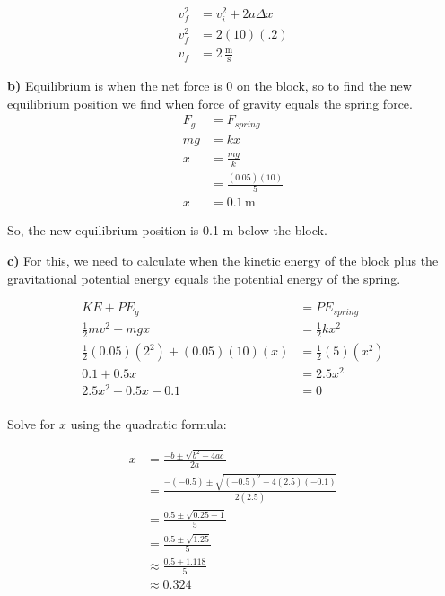 \documentclass{article}
\begin{document}
\begin{align*}
    v_f^2 &= v_i^2 + 2a\Delta x \\
    v_f^2 &= 2(10)(.2) \\
    v_f &= 2\,\frac{\text{m}}{\text{s}}
\end{align*}

\vspace{1cm}
\large\textbf{b)} Equilibrium is when the net force is 0 on the block, so to find the new equilibrium position we find when force of gravity equals the spring force.
\begin{align*}
    F_{g} &= F_{spring} \\
    mg &= kx \\
    x &= \frac{mg}{k} \\
    &= \frac{(0.05)(10)}{5} \\ 
    x &= 0.1 \, \text{m}
\end{align*}

So, the new equilibrium position is 0.1 m below the block.

\vspace{1cm}
\large\textbf{c)} For this, we need to calculate when the kinetic energy of the block plus the gravitational potential energy equals the potential energy of the spring.

\begin{align*}
    KE + PE_g &= PE_{spring}\\
    \frac{1}{2}mv^2 + mgx &= \frac{1}{2}kx^2 \\
    \frac{1}{2}(0.05)(2^2) + (0.05)(10)(x) &= \frac{1}{2}(5)(x^2) \\
    0.1 + 0.5x &= 2.5x^2 \\
    2.5x^2 - 0.5x - 0.1 &= 0 \\
\end{align*}

Solve for $x$ using the quadratic formula:

\begin{align*}
    x &= \frac{-b \pm \sqrt{b^2 - 4ac}}{2a} \\
    &= \frac{-(-0.5) \pm \sqrt{(-0.5)^2 - 4(2.5)(-0.1)}}{2(2.5)} \\
    &= \frac{0.5 \pm \sqrt{0.25 + 1}}{5} \\
    &= \frac{0.5 \pm \sqrt{1.25}}{5} \\
    &\approx \frac{0.5 \pm 1.118}{5} \\
    &\approx 0.324 \\
\end{align*}
\end{document}
